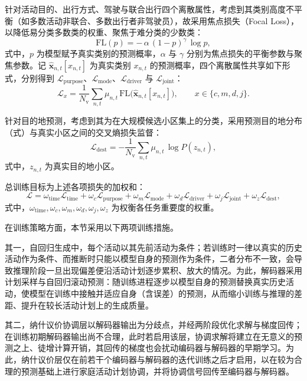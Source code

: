 针对活动目的、出行方式、驾驶与联合出行四个离散属性，考虑到其类别高度不平衡（如多数活动非联合、多数出行者非驾驶员），故采用焦点损失（Focal Loss）\citep{linFocalLossDense2017}，以降低易分类多数类的权重、聚焦于难分类的少数类：
\begin{equation}
\mathrm{FL}(p)=-\,\alpha\,(1-p)^{\gamma}\,\log p,
\label{eq.cohact.focal}
\end{equation}
式中，$p$ 为模型赋予真实类别的预测概率，$\alpha$ 与 $\gamma$ 分别为焦点损失的平衡参数与聚焦参数。记 $\hat{\mathbf{x}}_{n,t}[x_{n,t}]$ 为真实类别 $x_{n,t}$ 的预测概率，四个离散属性共享如下形式，分别得到 $\mathcal{L}_{\mathrm{purpose}}$、$\mathcal{L}_{\mathrm{mode}}$、$\mathcal{L}_{\mathrm{driver}}$ 与 $\mathcal{L}_{\mathrm{joint}}$：
\begin{equation}
\mathcal{L}_{x}=\frac{1}{N_{\mathrm{v}}}\sum_{n,t}\mu_{n,t}\,\mathrm{FL}\bigl(\hat{\mathbf{x}}_{n,t}[x_{n,t}]\bigr),\qquad x\in\{c,m,d,j\}.
\label{eq.cohact.losscat}
\end{equation}

针对目的地预测，考虑到其为在大规模候选小区集上的分类，采用预测目的地分布（式）与真实小区之间的交叉熵损失监督：
\begin{equation}
\mathcal{L}_{\mathrm{dest}}=-\frac{1}{N_{\mathrm{v}}}\sum_{n,t}\mu_{n,t}\,\log P(z_{n,t}),
\label{eq.cohact.lossdest}
\end{equation}
式中，$z_{n,t}$ 为真实目的地小区。

总训练目标为上述各项损失的加权和：
\begin{equation}
\mathcal{L}=\omega_{\mathrm{time}}\mathcal{L}_{\mathrm{time}}+\omega_c\mathcal{L}_{\mathrm{purpose}}+\omega_m\mathcal{L}_{\mathrm{mode}}+\omega_d\mathcal{L}_{\mathrm{driver}}+\omega_j\mathcal{L}_{\mathrm{joint}}+\omega_z\mathcal{L}_{\mathrm{dest}},
\label{eq.cohact.losstotal}
\end{equation}
式中，$\omega_{\mathrm{time}},\omega_c,\omega_m,\omega_d,\omega_j,\omega_z$ 为权衡各任务重要度的权重。

在训练策略方面，本节采用以下两项训练措施。

其一，自回归生成中，每个活动以其先前活动为条件；若训练时一律以真实的历史活动作为条件、而推断时只能以模型自身的预测作为条件，二者分布不一致，会导致推理阶段一旦出现偏差便沿活动计划逐步累积、放大的情况。为此，解码器采用计划采样与自回归滚动预测：随训练进程逐步以模型自身的预测替换真实历史活动，使模型在训练中接触并适应自身（含误差）的预测，从而缩小训练与推理的差距、提升在较长活动计划上的生成质量。

其二，纳什议价协调层以解码器输出为分歧点，并经两阶段优化求解与梯度回传；在训练初期解码器输出尚不合理，此时若启用该层，协调求解将建立在无意义的预测之上、徒增计算开销，其回传的梯度也会扰动编码器与解码器的早期学习。为此，纳什议价层仅在前若干个编码器与解码器的迭代训练之后才启用，以在较为合理的预测基础上进行家庭活动计划协调，并将协调信号回传至编码器与解码器。

